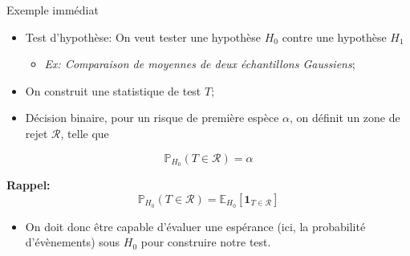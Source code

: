 \documentclass[ignorenonframetext,]{beamer}
\providecommand{\tightlist}{%
  \setlength{\itemsep}{0pt}\setlength{\parskip}{0pt}}
\begin{document}
\begin{frame}{Exemple immédiat}
\protect\hypertarget{exemple-immuxe9diat}{}

\begin{itemize}
\tightlist
\item
  Test d'hypothèse: On veut tester une hypothèse \(H_0\) contre une
  hypothèse \(H_1\)

  \begin{itemize}
  \tightlist
  \item
    \emph{Ex: Comparaison de moyennes de deux échantillons Gaussiens};
  \end{itemize}
\item
  On construit une statistique de test \(T\);
\item
  Décision binaire, pour un risque de première espèce \(\alpha\), on
  définit un zone de rejet \(\mathcal{R}\), telle que
\end{itemize}

\[\mathbb{P}_{H_0}\left(T \in \mathcal{R}\right) = \alpha\]

\pause

\textbf{Rappel:}
\[\mathbb{P}_{H_0}\left(T \in \mathcal{R}\right) = \mathbb{E}_{H_0}\left[\mathbf{1}_{T\in \mathcal{R}}\right]\]

\begin{itemize}
\tightlist
\item
  On doit donc être capable d'évaluer une espérance (ici, la probabilité
  d'évènements) sous \(H_0\) pour construire notre test.
\end{itemize}

\end{frame}
\end{document}
